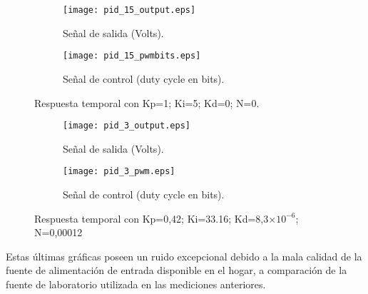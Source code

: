 \begin{figure}[H]
    \centering

    \begin{subfigure}[b]{0.49\textwidth}
        \centering
        \texttt{[image: pid\_15\_output.eps]}
        \caption{Señal de salida (Volts).}
        \label{fig:pid_15_output}
    \end{subfigure}
    \begin{subfigure}[b]{0.49\textwidth}
        \centering
        \texttt{[image: pid\_15\_pwmbits.eps]}
        \caption{Señal de control (duty cycle en bits).}
        \label{fig:pid_15_pwm}
    \end{subfigure}

    \vspace{-0.25cm}
    \caption{Respuesta temporal con Kp=1; Ki=5; Kd=0; N=0.}
    \label{fig:pid15_osciloscopio}
\end{figure}
\vspace{-0.5cm}

\begin{figure}[H]
    \centering

    \begin{subfigure}[b]{0.49\textwidth}
        \centering
        \texttt{[image: pid\_3\_output.eps]}
        \caption{Señal de salida (Volts).}
        \label{fig:pid3_micro}
    \end{subfigure}
    \begin{subfigure}[b]{0.49\textwidth}
        \centering
        \texttt{[image: pid\_3\_pwm.eps]}
        \caption{Señal de control (duty cycle en bits).}
        \label{fig:pid_3_pwm}
    \end{subfigure}

    \vspace{-0.25cm}
    \caption{Respuesta temporal con Kp=0,42; Ki=33.16; Kd=8,3$\times 10^{-6}$; N=0,00012}
    \label{fig:pid3}
\end{figure}
\vspace{-0.5cm}

Estas últimas gráficas poseen un ruido excepcional debido a la mala calidad de la fuente de alimentación
de entrada disponible en el hogar, a comparación de la fuente de laboratorio utilizada en las mediciones anteriores.